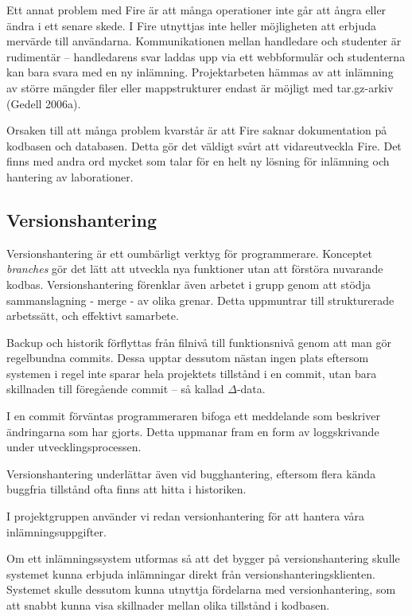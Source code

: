 Ett annat problem med Fire är att många operationer inte går att ångra eller ändra i ett senare skede. 
I Fire utnyttjas inte heller möjligheten att erbjuda mervärde till användarna. Kommunikationen mellan handledare och studenter är rudimentär – handledarens svar laddas upp via ett webbformulär och studenterna kan bara svara med en ny inlämning. Projektarbeten hämmas av att inlämning av större mängder filer eller mappstrukturer endast är möjligt med tar.gz-arkiv (Gedell 2006a).

Orsaken till att många problem kvarstår är att Fire saknar dokumentation på kodbasen och databasen. Detta gör det väldigt svårt att vidareutveckla Fire.
Det finns med andra ord mycket som talar för en helt ny lösning för inlämning och hantering av laborationer.

\subsection{Versionshantering}

Versionshantering är ett oumbärligt verktyg för programmerare. Konceptet \emph{branches} gör det lätt att utveckla nya funktioner utan att förstöra nuvarande kodbas. Versionshantering förenklar även arbetet i grupp genom att stödja sammanslagning - merge - av olika grenar. Detta uppmuntrar till strukturerade arbetssätt, och effektivt samarbete. 

Backup och historik förflyttas från filnivå till funktionsnivå genom att man gör regelbundna commits. Dessa upptar dessutom nästan ingen plats eftersom systemen i regel inte sparar hela projektets tillstånd i en commit, utan bara skillnaden till föregående commit – så kallad $\Delta$-data.

I en commit förväntas programmeraren bifoga ett meddelande som beskriver ändringarna som har gjorts. Detta uppmanar fram en form av loggskrivande under utvecklingsprocessen.

Versionshantering underlättar även vid bugghantering, eftersom flera kända buggfria tillstånd ofta finns att hitta i historiken.

I projektgruppen använder vi redan versionhantering för att hantera våra inlämningsuppgifter.

Om ett inlämningssystem utformas så att det bygger på versionshantering skulle systemet kunna erbjuda inlämningar direkt från versionshanteringsklienten. Systemet skulle dessutom kunna utnyttja fördelarna med versionhantering, som att snabbt kunna visa skillnader mellan olika tillstånd i kodbasen.


